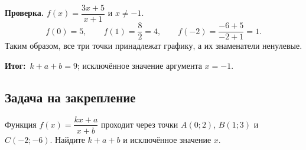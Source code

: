 \documentclass[a4paper,12pt]{article}
\newcommand{\res}{\textcolor{accent}{\textbf{Итог:}}}
\begin{document}
\textbf{Проверка.} $f(x)=\dfrac{3x+5}{x+1}$ и $x\ne-1$.
\[
f(0)=5,\qquad f(1)=\frac82=4,
\qquad f(-2)=\frac{-6+5}{-2+1}=1.
\]
Таким образом, все три точки принадлежат графику, а их знаменатели ненулевые.

\res\ $k+a+b=9$; исключённое значение аргумента $x=-1$.

\subsection*{Задача на закрепление}
Функция $f(x)=\dfrac{kx+a}{x+b}$ проходит через точки $A(0;2)$, $B(1;3)$ и $C(-2;-6)$. Найдите $k+a+b$ и исключённое значение $x$.
\end{document}
